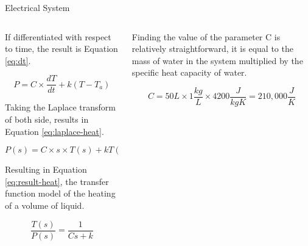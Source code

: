 \documentclass[final]{beamer}
\newlength{\onecolwid}
\newlength{\twocolwid}
\begin{document}
\begin{frame}[t]
\begin{columns}[t]
\begin{column}{\twocolwid}
\begin{block}{Electrical System}
\begin{columns}[t,totalwidth=\twocolwid]
\begin{column}{\onecolwid}
\begin{justify}
\noindent If differentiated with respect to time, the result is Equation \ref{eq:dt}.

\begin{equation}
P = C \times \frac{dT}{dt} + k(T - T_{a})
\label{eq:dt}
\end{equation}

Taking the Laplace transform of both side, results in Equation \ref{eq:laplace-heat}.

\begin{equation}
P(s) = C \times s \times T(s) + kT(s)
\label{eq:laplace-heat}
\end{equation}

\noindent Resulting in Equation \ref{eq:result-heat}, the transfer function model of the heating of a volume of liquid.

\begin{equation}
\frac{T(s)}{P(s)} = \frac{1}{Cs + k}
\label{eq:result-heat}
\end{equation}
\end{justify}

\end{column} %

\begin{column}{\onecolwid} %
\vspace{-0.3in}
\begin{justify}
Finding the value of the parameter C is relatively straightforward, it is equal to the mass of water in the system multiplied by the specific heat capacity of water.

\begin{equation}
C = 50L \times 1\frac{kg}{L} \times 4200\frac{J}{kgK} = 210,000\frac{J}{K}
\label{eq:value-heat}
\end{equation}


\end{justify}
\end{column}
\end{columns}
\end{block}
\end{column}
\end{columns}
\end{frame}
\end{document}
